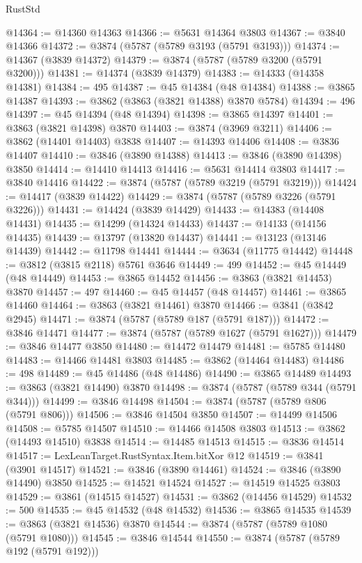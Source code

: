 \begin{lexlean}{RustStd}
\begin{coremodule}
@14364 := @14360 @14363
@14366 := @5631 @14364 @3803
@14367 := @3840 @14366
@14372 := @3874 (@5787 (@5789 @3193 (@5791 @3193)))
@14374 := @14367 (@3839 @14372)
@14379 := @3874 (@5787 (@5789 @3200 (@5791 @3200)))
@14381 := @14374 (@3839 @14379)
@14383 := @14333 (@14358 @14381)
@14384 := 495
@14387 := @45 @14384 (@48 @14384)
@14388 := @3865 @14387
@14393 := @3862 (@3863 (@3821 @14388) @3870 @5784)
@14394 := 496
@14397 := @45 @14394 (@48 @14394)
@14398 := @3865 @14397
@14401 := @3863 (@3821 @14398) @3870
@14403 := @3874 (@3969 @3211)
@14406 := @3862 (@14401 @14403) @3838
@14407 := @14393 @14406
@14408 := @3836 @14407
@14410 := @3846 (@3890 @14388)
@14413 := @3846 (@3890 @14398) @3850
@14414 := @14410 @14413
@14416 := @5631 @14414 @3803
@14417 := @3840 @14416
@14422 := @3874 (@5787 (@5789 @3219 (@5791 @3219)))
@14424 := @14417 (@3839 @14422)
@14429 := @3874 (@5787 (@5789 @3226 (@5791 @3226)))
@14431 := @14424 (@3839 @14429)
@14433 := @14383 (@14408 @14431)
@14435 := @14299 (@14324 @14433)
@14437 := @14133 (@14156 @14435)
@14439 := @13797 (@13820 @14437)
@14441 := @13123 (@13146 @14439)
@14442 := @11798 @14441
@14444 := @3634 (@11775 @14442)
@14448 := @3812 (@3815 @2118) @5761 @3646
@14449 := 499
@14452 := @45 @14449 (@48 @14449)
@14453 := @3865 @14452
@14456 := @3863 (@3821 @14453) @3870
@14457 := 497
@14460 := @45 @14457 (@48 @14457)
@14461 := @3865 @14460
@14464 := @3863 (@3821 @14461) @3870
@14466 := @3841 (@3842 @2945)
@14471 := @3874 (@5787 (@5789 @187 (@5791 @187)))
@14472 := @3846 @14471
@14477 := @3874 (@5787 (@5789 @1627 (@5791 @1627)))
@14479 := @3846 @14477 @3850
@14480 := @14472 @14479
@14481 := @5785 @14480
@14483 := @14466 @14481 @3803
@14485 := @3862 (@14464 @14483)
@14486 := 498
@14489 := @45 @14486 (@48 @14486)
@14490 := @3865 @14489
@14493 := @3863 (@3821 @14490) @3870
@14498 := @3874 (@5787 (@5789 @344 (@5791 @344)))
@14499 := @3846 @14498
@14504 := @3874 (@5787 (@5789 @806 (@5791 @806)))
@14506 := @3846 @14504 @3850
@14507 := @14499 @14506
@14508 := @5785 @14507
@14510 := @14466 @14508 @3803
@14513 := @3862 (@14493 @14510) @3838
@14514 := @14485 @14513
@14515 := @3836 @14514
@14517 := LexLeanTarget.RustSyntax.Item.bitXor @12
@14519 := @3841 (@3901 @14517)
@14521 := @3846 (@3890 @14461)
@14524 := @3846 (@3890 @14490) @3850
@14525 := @14521 @14524
@14527 := @14519 @14525 @3803
@14529 := @3861 (@14515 @14527)
@14531 := @3862 (@14456 @14529)
@14532 := 500
@14535 := @45 @14532 (@48 @14532)
@14536 := @3865 @14535
@14539 := @3863 (@3821 @14536) @3870
@14544 := @3874 (@5787 (@5789 @1080 (@5791 @1080)))
@14545 := @3846 @14544
@14550 := @3874 (@5787 (@5789 @192 (@5791 @192)))

\end{coremodule}
\end{lexlean}
